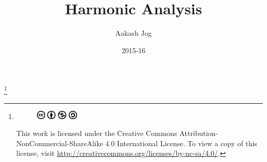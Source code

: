 \documentclass[fleqn, 8pt]{amsart}
\title{Harmonic Analysis}
\author{Aakash Jog}
\date{2015-16}
\theoremstyle{definition}
\theoremstyle{theorem}
\newcommand\blfootnote[1]{%
	\begingroup
	\renewcommand\thefootnote{}\footnote{#1}%
	\addtocounter{footnote}{-1}%
	\endgroup
}
\begin{document}
\maketitle
\setlength{\mathindent}{0pt}

\blfootnote
{	
	\begin{figure}[H]
		\includegraphics[height = 12pt]{cc.eps}
		\includegraphics[height = 12pt]{by.eps}
		\includegraphics[height = 12pt]{nc.eps}
		\includegraphics[height = 12pt]{sa.eps}
	\end{figure}
	This work is licensed under the Creative Commons Attribution-NonCommercial-ShareAlike 4.0 International License. To view a copy of this license, visit \url{http://creativecommons.org/licenses/by-nc-sa/4.0/}.
} %
\end{document}
